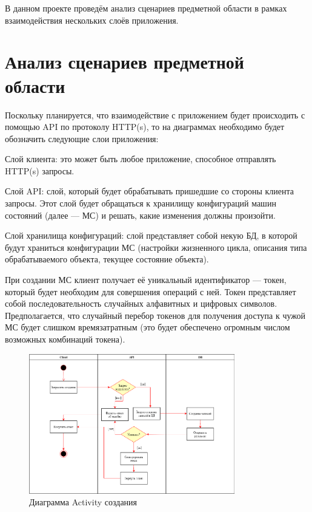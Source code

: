 \documentclass[a4paper,10pt]{article}
\begin{document}
В данном проекте проведём анализ сценариев предметной области в рамках
взаимодействия нескольких слоёв приложения.

\section{Анализ сценариев предметной области} \label{Анализ сценариев предметной области}

Поскольку планируется, что взаимодействие с приложением будет происходить
с помощью API по протоколу HTTP(s), то на диаграммах необходимо будет обозначить
следующие слои приложения:

\begin{asparaenum}
    \item Слой клиента: это может быть любое приложение, способное отправлять HTTP(s) запросы.
    \item Слой API: слой, который будет обрабатывать пришедшие со стороны клиента запросы.
        Этот слой будет обращаться к хранилищу конфигураций машин состояний (далее --- МС) и
        решать, какие изменения должны произойти.
    \item Слой хранилища конфигураций: слой представляет собой некую БД, в которой
        будут храниться конфигурации МС (настройки жизненного цикла, описания типа
        обрабатываемого объекта, текущее состояние объекта).
\end{asparaenum}

При создании МС клиент получает её уникальный идентификатор --- токен, который
будет необходим для совершения операций с ней. Токен представляет собой последовательность
случайных алфавитных и цифровых символов. Предполагается, что случайный перебор
токенов для получения доступа к чужой МС будет слишком времязатратным (это
будет обеспечено огромным числом возможных комбинаций токена).

\begin{figure}[htpb]
    \centering
    \includegraphics[width=0.8\textwidth]{activity_diagram}
    \caption{Диаграмма Activity создания}
    \label{fig:activity_diagram}
\end{figure}
\end{document}
